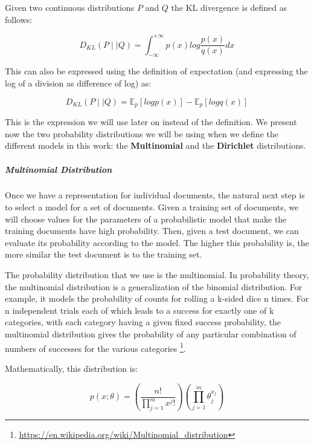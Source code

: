 \documentclass[12pt]{report}
\begin{document}
Given two continuous distributions $P$ and $Q$ the KL divergence is defined as follows:

\begin{equation}
D_{KL}(P \mid \mid Q) = \int_{-\infty}^{+\infty} p(x) log\frac{p(x)}{q(x)}dx
\end{equation}

This can also be expressed using the definition of expectation (and expressing the 
log of a division as difference of log) as:

\begin{equation}
D_{KL}(P \mid \mid Q) = \mathbb{E}_{p}[log p(x)] - \mathbb{E}_{p}[log q(x)]
\end{equation}

This is the expression we will use later on instead of the definition. We present 
now the two probability distributions we will be using when we define the different 
models in this work: the \textbf{Multinomial} and the \textbf{Dirichlet} distributions. 


\subparagraph{Multinomial Distribution}

Once we have a representation for individual documents, the natural next step
is to select a model for a set of documents. Given a training set of
documents, we will choose values for the parameters of a probabilistic model
that make the training documents have high probability. Then, given a test
document, we can evaluate its probability according to the model. The higher
this probability is, the more similar the test document is to the training set.


The probability distribution that we use is the multinomial. In probability 
theory, the multinomial distribution is a generalization of the binomial 
distribution. For example, it models the probability of counts for rolling 
a k-sided dice n times. For n independent trials each of which leads to a 
success for exactly one of k categories, with each category having a given 
fixed success probability, the multinomial distribution gives the 
probability of any particular combination of numbers of successes for the 
various categories \footnote{\url{https://en.wikipedia.org/wiki/Multinomial_distribution}}. 

Mathematically, this distribution is: 

\begin{equation}
p(x;\theta) = \left(\frac{n!}{\prod\limits_{j=1}^m x^j!}\right)\left
(\prod\limits_{j=1}^m \theta_j^{x_j}\right)
\end{equation}
\end{document}
